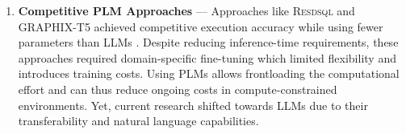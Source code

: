 \begin{enumerate}
        interpretations. Approaches like multi-path reasoning and candidate
        selection show improvements in execution accuracy, but often increase
        inference time and complexity
        \citep{CHASE, XiYan}.
    \item \textbf{Competitive PLM Approaches} — Approaches like
        \textsc{Resdsql} and GRAPHIX-T5 achieved competitive execution accuracy
        while using fewer parameters than LLMs \citep{RESDSQL}. Despite
        reducing inference-time requirements, these approaches required
        domain-specific fine-tuning which limited flexibility and introduces
        training costs. Using PLMs allows frontloading the computational effort
        and can thus reduce ongoing costs in compute-constrained environments.
        Yet, current research shifted towards LLMs due to their transferability
        and natural language capabilities.
\end{enumerate}
